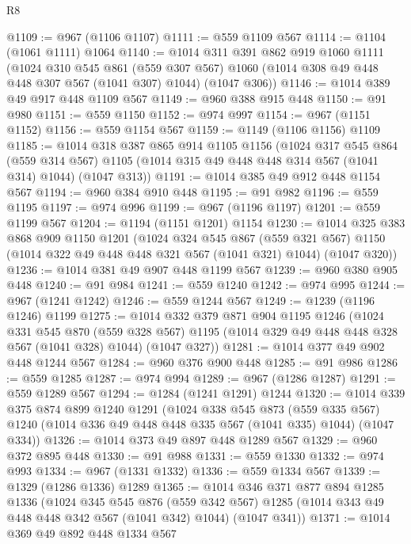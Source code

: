 \begin{lexlean}{R8}
\begin{coremodule}
@1109 := @967 (@1106 @1107)
@1111 := @559 @1109 @567
@1114 := @1104 (@1061 @1111) @1064
@1140 := @1014
    @311
    @391
    @862
    @919
    @1060
    @1111
    (@1024
      @310
      @545
      @861
      (@559 @307 @567)
      @1060
      (@1014 @308 @49 @448 @448 @307 @567 (@1041 @307) @1044)
      (@1047 @306))
@1146 := @1014 @389 @49 @917 @448 @1109 @567
@1149 := @960 @388 @915 @448
@1150 := @91 @980
@1151 := @559 @1150
@1152 := @974 @997
@1154 := @967 (@1151 @1152)
@1156 := @559 @1154 @567
@1159 := @1149 (@1106 @1156) @1109
@1185 := @1014
    @318
    @387
    @865
    @914
    @1105
    @1156
    (@1024
      @317
      @545
      @864
      (@559 @314 @567)
      @1105
      (@1014 @315 @49 @448 @448 @314 @567 (@1041 @314) @1044)
      (@1047 @313))
@1191 := @1014 @385 @49 @912 @448 @1154 @567
@1194 := @960 @384 @910 @448
@1195 := @91 @982
@1196 := @559 @1195
@1197 := @974 @996
@1199 := @967 (@1196 @1197)
@1201 := @559 @1199 @567
@1204 := @1194 (@1151 @1201) @1154
@1230 := @1014
    @325
    @383
    @868
    @909
    @1150
    @1201
    (@1024
      @324
      @545
      @867
      (@559 @321 @567)
      @1150
      (@1014 @322 @49 @448 @448 @321 @567 (@1041 @321) @1044)
      (@1047 @320))
@1236 := @1014 @381 @49 @907 @448 @1199 @567
@1239 := @960 @380 @905 @448
@1240 := @91 @984
@1241 := @559 @1240
@1242 := @974 @995
@1244 := @967 (@1241 @1242)
@1246 := @559 @1244 @567
@1249 := @1239 (@1196 @1246) @1199
@1275 := @1014
    @332
    @379
    @871
    @904
    @1195
    @1246
    (@1024
      @331
      @545
      @870
      (@559 @328 @567)
      @1195
      (@1014 @329 @49 @448 @448 @328 @567 (@1041 @328) @1044)
      (@1047 @327))
@1281 := @1014 @377 @49 @902 @448 @1244 @567
@1284 := @960 @376 @900 @448
@1285 := @91 @986
@1286 := @559 @1285
@1287 := @974 @994
@1289 := @967 (@1286 @1287)
@1291 := @559 @1289 @567
@1294 := @1284 (@1241 @1291) @1244
@1320 := @1014
    @339
    @375
    @874
    @899
    @1240
    @1291
    (@1024
      @338
      @545
      @873
      (@559 @335 @567)
      @1240
      (@1014 @336 @49 @448 @448 @335 @567 (@1041 @335) @1044)
      (@1047 @334))
@1326 := @1014 @373 @49 @897 @448 @1289 @567
@1329 := @960 @372 @895 @448
@1330 := @91 @988
@1331 := @559 @1330
@1332 := @974 @993
@1334 := @967 (@1331 @1332)
@1336 := @559 @1334 @567
@1339 := @1329 (@1286 @1336) @1289
@1365 := @1014
    @346
    @371
    @877
    @894
    @1285
    @1336
    (@1024
      @345
      @545
      @876
      (@559 @342 @567)
      @1285
      (@1014 @343 @49 @448 @448 @342 @567 (@1041 @342) @1044)
      (@1047 @341))
@1371 := @1014 @369 @49 @892 @448 @1334 @567

\end{coremodule}
\end{lexlean}

